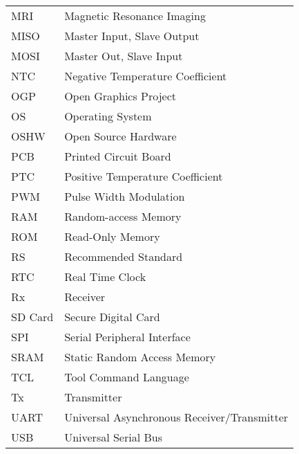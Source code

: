 \begin{tabular}{ll} \\
MRI & Magnetic Resonance Imaging \\
MISO & Master Input, Slave Output \\
MOSI & Master Out, Slave Input \\
NTC & Negative Temperature Coefficient \\
OGP & Open Graphics Project \\
OS & Operating System \\
OSHW & Open Source Hardware \\
PCB & Printed Circuit Board \\
PTC & Positive Temperature Coefficient \\
PWM & Pulse Width Modulation \\
RAM & Random-access Memory \\
ROM & Read-Only Memory \\
RS & Recommended Standard \\
RTC & Real Time Clock \\
Rx & Receiver \\
SD Card & Secure Digital Card \\
SPI & Serial Peripheral Interface \\
SRAM & Static Random Access Memory \\
TCL & Tool Command Language \\
Tx & Transmitter \\
UART & Universal Asynchronous Receiver/Transmitter \\
USB & Universal Serial Bus \\
\end{tabular}
